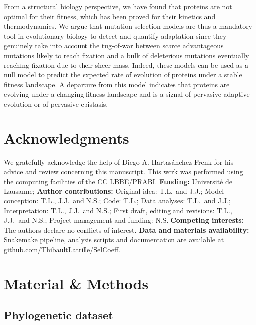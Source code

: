 \documentclass{article}
\begin{document}
    From a structural biology perspective, we have found that proteins are not optimal for their fitness, which has been proved for their kinetics and thermodynamics\cite{taverna_why_2002, goldstein_evolution_2011}.
    We argue that mutation-selection models are thus a mandatory tool in evolutionary biology to detect and quantify adaptation since they genuinely take into account the tug-of-war between scarce advantageous mutations likely to reach fixation and a bulk of deleterious mutations eventually reaching fixation due to their sheer mass.
    Indeed, these models can be used as a null model to predict the expected rate of evolution of proteins\cite{spielman_relationship_2015, dosreis_how_2015} under a stable fitness landscape.
    A departure from this model indicates that proteins are evolving under a changing fitness landscape\cite{rodrigue_detecting_2017, tamuri_mutationselection_2021} and is a signal of pervasive adaptive evolution\cite{rodrigue_bayesian_2021} or of pervasive epistasis\cite{rodrigue_detecting_2017}.


    \section*{Acknowledgments}
    \label{sec:acknowledgment}
    We gratefully acknowledge the help of Diego A. Hartasánchez Frenk for his advice and review concerning this manuscript.
    This work was performed using the computing facilities of the CC LBBE/PRABI\@.
    \textbf{Funding:}
    Université de Lausanne;
    \textbf{Author contributions:}
    Original idea: T.L.\ and J.J.;
    Model conception: T.L., J.J.\ and N.S.;
    Code: T.L.;
    Data analyses: T.L.\ and J.J.;
    Interpretation: T.L., J.J.\ and N.S.;
    First draft, editing and revisions: T.L., J.J.\ and N.S.;
    Project management and funding: N.S\@.
    \textbf{Competing interests:}
    The authors declare no conflicts of interest.
    \textbf{Data and materials availability:}
    Snakemake pipeline, analysis scripts and documentation are available at \href{https://github.com/ThibaultLatrille/SelCoeff}{github.com/ThibaultLatrille/SelCoeff}.


    \section{Material \& Methods}
    \label{sec:methods}

    \subsection{Phylogenetic dataset}
\end{document}
